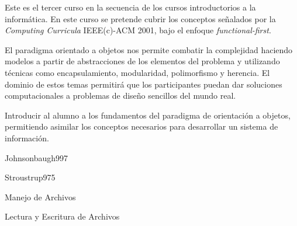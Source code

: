 \begin{syllabus}


\begin{justification}
Este es el tercer curso en la secuencia de los cursos introductorios a la informática. En este curso se pretende cubrir los conceptos señalados por la \textit{Computing Curricula} IEEE(c)-ACM 2001, bajo el enfoque \textit{functional-first}. 

El paradigma orientado a objetos nos permite combatir la
complejidad haciendo modelos a partir de abstracciones de los elementos del problema y utilizando técnicas como encapsulamiento,
modularidad, polimorfismo y herencia. El dominio de estos temas permitirá que los participantes puedan dar soluciones computacionales a problemas de diseño sencillos del mundo real.
\end{justification}

\begin{goals}
\item Introducir al alumno a los fundamentos del paradigma de orientación a objetos, permitiendo asimilar los conceptos necesarios para desarrollar un sistema de información.
\end{goals}

\begin{outcomes}
\end{outcomes}

\begin{unit}{\DSFIVEDef}{Johnsonbaugh99}{7}
\DSFIVEAllTopics
   \begin{learningoutcomes}
      \item \DSFIVEObjONE
      \item \DSFIVEObjTWO
      \item \DSFIVEObjTHREE
   \end{learningoutcomes}
\end{unit}

\begin{unit}{\PFONEDef}{Stroustrup97}{5}
   \begin{topics}
      \item \PFONETopicSintaxis
      \item \PFONETopicVariables
      \item \PFONETopicEstructuras
      \item \PFONETopicFunciones
      \item Manejo de Archivos
      \item Lectura y Escritura de Archivos
 \end{topics}


\end{unit}
\end{syllabus}
